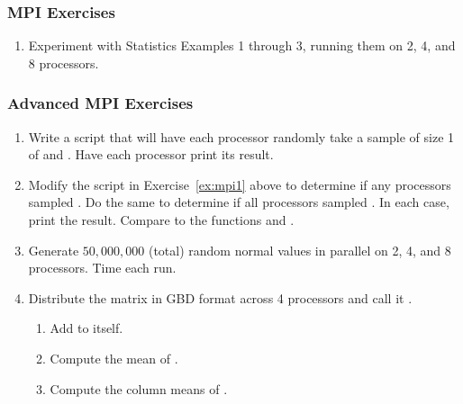 \begin{frame}
\frametitle{MPI Exercises}
\begin{enumerate}
  \item Experiment with Statistics Examples 1 through 3, running them on 2, 4, and 8 processors.
\end{enumerate}
\end{frame}


\begin{frame}[allowframebreaks=.8]
\frametitle{Advanced MPI Exercises}
\begin{enumerate}
  \item Write a script that will have each processor randomly take a sample of
        size 1 of  and . Have each processor print its
        result.\label{ex:mpi1}

  \item Modify the script in Exercise~\ref{ex:mpi1} above to determine if any
  processors sampled . Do the same to determine if all processors 
  sampled . In each case, print the result. Compare to the functions 
   and .
  
  \item Generate $50,000,000$ (total) random normal values in parallel on 2, 4, and 8 processors.  Time each run.
  
  
  \item Distribute the matrix  in GBD format across 4 processors and call it .  
  \begin{enumerate}
    \item Add  to itself.
    \item Compute the mean of .
    \item Compute the column means of .
  \end{enumerate}
  
\end{enumerate}
\end{frame}